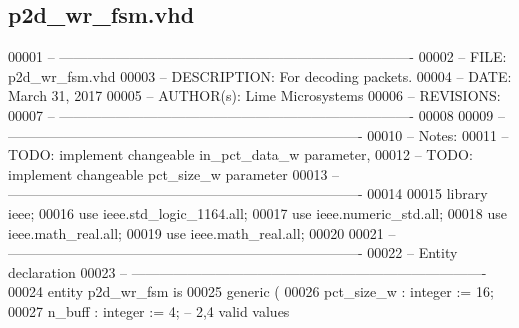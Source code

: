 \subsection{p2d\+\_\+wr\+\_\+fsm.\+vhd}
\label{p2d__wr__fsm_8vhd_source}

\begin{DoxyCode}
00001 \textcolor{keyword}{-- ---------------------------------------------------------------------------- }
00002 \textcolor{keyword}{-- FILE:    p2d\_wr\_fsm.vhd}
00003 \textcolor{keyword}{-- DESCRIPTION: For decoding packets.}
00004 \textcolor{keyword}{-- DATE:    March 31, 2017}
00005 \textcolor{keyword}{-- AUTHOR(s):   Lime Microsystems}
00006 \textcolor{keyword}{-- REVISIONS:}
00007 \textcolor{keyword}{-- ---------------------------------------------------------------------------- }
00008 
00009 \textcolor{keyword}{-- ----------------------------------------------------------------------------}
00010 \textcolor{keyword}{-- Notes:}
00011 \textcolor{keyword}{-- TODO: implement changeable in\_pct\_data\_w parameter,}
00012 \textcolor{keyword}{-- TODO: implement changeable pct\_size\_w parameter}
00013 \textcolor{keyword}{-- ----------------------------------------------------------------------------}
00014 
00015 \textcolor{vhdlkeyword}{library }\textcolor{keywordflow}{ieee};
00016 \textcolor{vhdlkeyword}{use }ieee.std\_logic\_1164.\textcolor{keywordflow}{all};
00017 \textcolor{vhdlkeyword}{use }ieee.numeric\_std.\textcolor{keywordflow}{all};
00018 \textcolor{vhdlkeyword}{use }ieee.math\_real.\textcolor{keywordflow}{all};
00019 \textcolor{vhdlkeyword}{use }ieee.math\_real.\textcolor{keywordflow}{all};
00020 
00021 \textcolor{keyword}{-- ----------------------------------------------------------------------------}
00022 \textcolor{keyword}{-- Entity declaration}
00023 \textcolor{keyword}{-- ----------------------------------------------------------------------------}
00024 \textcolor{keywordflow}{entity }p2d_wr_fsm \textcolor{keywordflow}{is}
00025    \textcolor{keywordflow}{generic} \textcolor{vhdlchar}{(}
00026       \textcolor{vhdlchar}{pct_size_w}        \textcolor{vhdlchar}{:} \textcolor{comment}{integer} \textcolor{vhdlchar}{:=} \textcolor{vhdllogic}{}\textcolor{vhdllogic}{16};
00027       \textcolor{vhdlchar}{n_buff}            \textcolor{vhdlchar}{:} \textcolor{comment}{integer} \textcolor{vhdlchar}{:=} \textcolor{vhdllogic}{}\textcolor{vhdllogic}{4};\textcolor{keyword}{ -- 2,4 valid values}

\end{DoxyCode}
